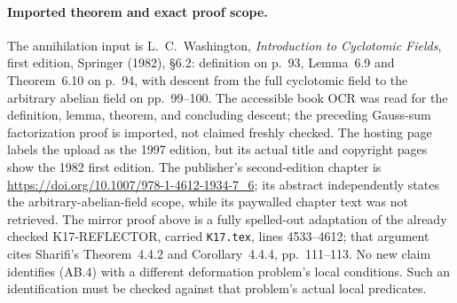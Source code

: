 \paragraph{Imported theorem and exact proof scope.}
The annihilation input is L.~C.~Washington,
\emph{Introduction to Cyclotomic Fields}, first edition,
Springer (1982), \S6.2: definition on p.~93,
Lemma~6.9 and Theorem~6.10 on p.~94, with descent from
the full cyclotomic field to the arbitrary abelian field
on pp.~99--100.  The accessible book OCR was read for
the definition, lemma, theorem, and concluding descent;
the preceding Gauss-sum factorization proof is imported,
not claimed freshly checked.  The hosting page labels
the upload as the 1997 edition, but its actual title
and copyright pages show the 1982 first edition.
The publisher's second-edition chapter is
\url{https://doi.org/10.1007/978-1-4612-1934-7_6};
its abstract independently states the arbitrary-abelian-field
scope, while its paywalled chapter text was not retrieved.
The mirror proof above is a fully spelled-out adaptation
of the already checked K17-REFLECTOR, carried
\texttt{K17.tex}, lines 4533--4612; that argument cites
Sharifi's Theorem~4.4.2 and Corollary~4.4.4, pp.~111--113.
No new claim identifies (AB.4) with a different deformation
problem's local conditions.  Such an identification must
be checked against that problem's actual local predicates.

